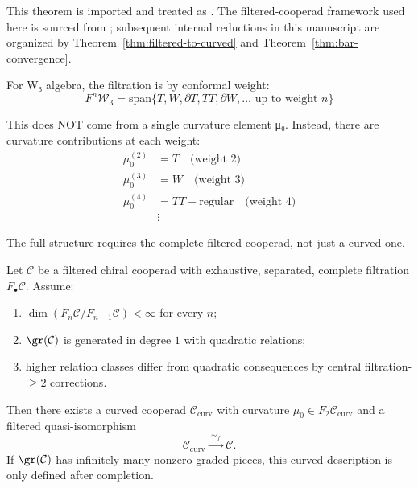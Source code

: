 \begin{remark}
This theorem is imported and treated as \ClaimStatusProvedElsewhere. The
filtered-cooperad framework used here is sourced from \cite{GLZ22}; subsequent
internal reductions in this manuscript are organized by
Theorem~\ref{thm:filtered-to-curved} and Theorem~\ref{thm:bar-convergence}.
\end{remark}

\begin{example}
\label{ex:w-algebra-filtered-comprehensive}
For W₃ algebra, the filtration is by conformal weight:
\begin{equation}
F^n \mathcal{W}_3 = \text{span}\{T, W, \partial T, TT, \partial W, \ldots \text{ up to 
weight } n\}
\end{equation}

This does NOT come from a single curvature element μ₀. Instead, there are curvature 
contributions at each weight:
\begin{align}
\mu_0^{(2)} &= T \quad \text{(weight 2)}\\
\mu_0^{(3)} &= W \quad \text{(weight 3)}\\
\mu_0^{(4)} &= TT + \text{regular} \quad \text{(weight 4)}\\
&\vdots
\end{align}

The full structure requires the complete filtered cooperad, not just a curved one.
\end{example}

\begin{theorem}
\label{thm:filtered-to-curved}
Let $\mathcal{C}$ be a filtered chiral cooperad with exhaustive, separated, complete
filtration $F_\bullet\mathcal{C}$. Assume:
\begin{enumerate}
\item $\dim(F_n\mathcal{C}/F_{n-1}\mathcal{C})<\infty$ for every $n$;
\item $\gr(\mathcal{C})$ is generated in degree $1$ with quadratic relations;
\item higher relation classes differ from quadratic consequences by central
filtration-$\ge2$ corrections.
\end{enumerate}
Then there exists a curved cooperad $\mathcal{C}_{\mathrm{curv}}$ with curvature
$\mu_0\in F_2\mathcal{C}_{\mathrm{curv}}$ and a filtered quasi-isomorphism
\[
\mathcal{C}_{\mathrm{curv}}\xrightarrow{\;\simeq_f\;}\mathcal{C}.
\]
If $\gr(\mathcal{C})$ has infinitely many nonzero graded pieces, this curved
description is only defined after completion.
\end{theorem}

